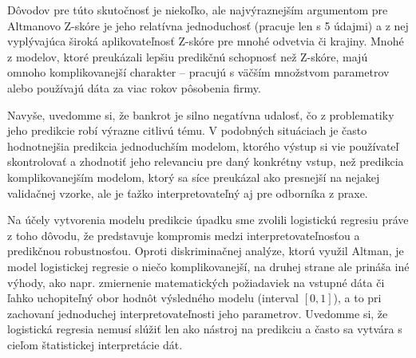 Dôvodov pre túto skutočnosť je niekoľko, ale najvýraznejším argumentom pre Altmanovo Z-skóre je jeho relatívna jednoduchosť (pracuje len s 5 údajmi)
a z nej vyplývajúca široká aplikovateľnosť Z-skóre pre mnohé odvetvia či krajiny.
Mnohé z modelov, ktoré preukázali lepšiu predikčnú schopnosť než Z-skóre,
majú omnoho komplikovanejší charakter – pracujú s väčším množstvom parametrov alebo používajú dáta za viac rokov pôsobenia firmy.

Navyše, uvedomme si, že bankrot je silno negatívna udalosť, čo z problematiky jeho predikcie robí výrazne citlivú tému.
V podobných situáciach je často hodnotnejšia predikcia jednoduchším modelom,
ktorého výstup si vie používateľ skontrolovať a zhodnotiť jeho relevanciu pre daný konkrétny vstup, než predikcia komplikovanejším modelom,
ktorý sa síce preukázal ako presnejší na nejakej validačnej vzorke, ale je ťažko interpretovateľný aj pre odborníka z praxe.

Na účely vytvorenia modelu predikcie úpadku sme zvolili logistickú regresiu práve z toho dôvodu,
že predstavuje kompromis medzi interpretovateľnosťou a predikčnou robustnosťou.
Oproti diskriminačnej analýze, ktorú využil Altman, je model logistickej regresie o niečo komplikovanejší,
na druhej strane ale prináša iné výhody, ako napr. zmiernenie matematických požiadaviek na vstupné dáta
či ľahko uchopiteľný obor hodnôt výsledného modelu (interval \([0, 1]\)), a to pri zachovaní jednoduchej interpretovateľnosti jeho parametrov.
Uvedomme si, že logistická regresia nemusí slúžiť len ako nástroj na predikciu a často sa vytvára s cieľom štatistickej interpretácie dát.